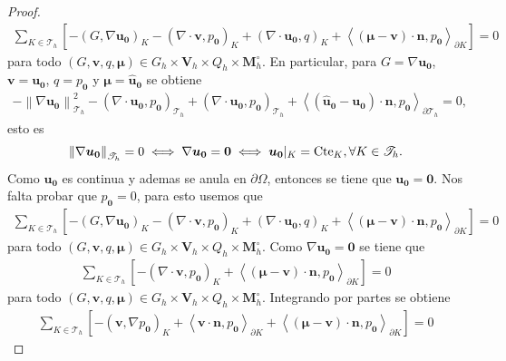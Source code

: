 \documentclass[10pt,a4paper]{report}
\newcommand{\bs}{\boldsymbol}
\newcommand{\Th}{\mathscr{T}_{h}}
\providecommand{\norm}[1]{\left\lVert#1\right\rVert}
\providecommand{\PI}[2]{\left\langle #1,#2  \right\rangle}
\providecommand{\Pii}[2]{\left( #1,#2  \right)}
\begin{document}
\begin{proof}
    \begin{align*}
    		\sum_{K\in\Th}\left[  -\Pii{G}{\nabla\bs{u}_{\bs{0}}}_{K} - \Pii{\nabla\cdot \bs{v}}{p_{\bs{0}}}_{K} + \Pii{\nabla\cdot \bs{u}_{\bs{0}}}{q}_{K} + \PI{\left(\bs{\mu} - \bs{v}\right)\cdot\bs{n}}{p_{\bs{0}}}_{\partial K} \right] = 0
    \end{align*}
    para todo $\left(G,\bs{v},q,\bs{\mu}\right)\in G_{h}\times\bs{V}_{h}\times Q_{h}\times \bs{M}^{\circ}_{h}$. En particular, para $G = \nabla \bs{u}_{\bs{0}}$, $\bs{v} = \bs{u}_{\bs{0}}$, $q = p_{\bs{0}}$ y $\bs{\mu} = \bs{\hat{u}}_{\bs{0}}$ se obtiene
    \begin{align*}
    	-\norm{\nabla\bs{u}_{\bs{0}}}^{2}_{\Th} - \Pii{\nabla\cdot \bs{u}_{\bs{0}}}{p_{\bs{0}}}_{\Th} + \Pii{\nabla\cdot \bs{u}_{\bs{0}}}{p_{\bs{0}}}_{\Th} + \PI{\left(\bs{\hat{u}}_{\bs{0}} - \bs{u}_{\bs{0}}\right)\cdot\bs{n}}{p_{\bs{0}}}_{\partial \Th} = 0,
    \end{align*}
    esto es 
    \begin{align*}
    	\norm{\nabla\bs{u}_{\bs{0}}}_{\Th} = 0 \iff \nabla\bs{u}_{\bs{0}} = \bs{0} \iff \bs{u}_{\bs{0}}|_{K} = \textup{Cte}_{K}, \forall K\in \Th.
    \end{align*}
    Como $\bs{u}_{\bs{0}}$ es continua y ademas se anula en $\partial\Omega$, entonces se tiene que $\bs{u}_{\bs{0}} = \bs{0}$. Nos falta probar que $p_{\bs{0}} = 0$, para esto usemos que
    \begin{align*}
    	\sum_{K\in\Th}\left[  -\Pii{G}{\nabla\bs{u}_{\bs{0}}}_{K} - \Pii{\nabla\cdot \bs{v}}{p_{\bs{0}}}_{K} + \Pii{\nabla\cdot \bs{u}_{\bs{0}}}{q}_{K} + \PI{\left(\bs{\mu} - \bs{v}\right)\cdot\bs{n}}{p_{\bs{0}}}_{\partial K} \right] = 0
    \end{align*}
    para todo $\left(G,\bs{v},q,\bs{\mu}\right)\in G_{h}\times\bs{V}_{h}\times Q_{h}\times \bs{M}^{\circ}_{h}$. Como $\nabla \bs{u}_{\bs{0}} = \bs{0}$ se tiene que 
    \begin{align*}
    	\sum_{K\in\Th}\left[   - \Pii{\nabla\cdot \bs{v}}{p_{\bs{0}}}_{K} + \PI{\left(\bs{\mu} - \bs{v}\right)\cdot\bs{n}}{p_{\bs{0}}}_{\partial K} \right] = 0
    \end{align*}
    para todo $\left(G,\bs{v},q,\bs{\mu}\right)\in G_{h}\times\bs{V}_{h}\times Q_{h}\times \bs{M}^{\circ}_{h}$. Integrando por partes se obtiene 
    \begin{align}\label{eq:pql}
    	\sum_{K\in\Th}\left[   - \Pii{\bs{v}}{\nabla p_{\bs{0}}}_{K} + \PI{\bs{v}\cdot\bs{n}}{p_{\bs{0}}}_{\partial K} + \PI{\left(\bs{\mu} - \bs{v}\right)\cdot\bs{n}}{p_{\bs{0}}}_{\partial K} \right] = 0

\end{align}
\end{proof}
\end{document}
